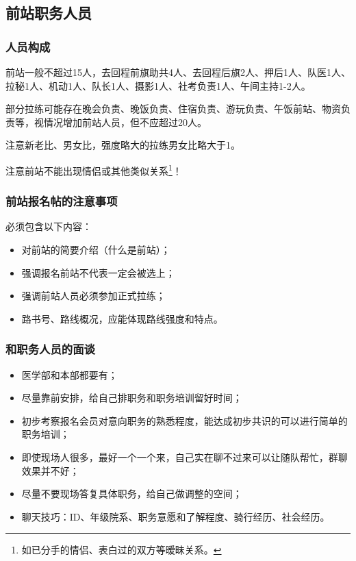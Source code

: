 \documentclass[UTF8]{ctexart}
\begin{document}
\subsection{前站职务人员}

\subsubsection{人员构成}

前站一般不超过15人，去回程前旗助共4人、去回程后旗2人、押后1人、队医1人、拉秘1人、机动1人、队长1人、摄影1人、社考负责1人、午间主持1-2人。

部分拉练可能存在晚会负责、晚饭负责、住宿负责、游玩负责、午饭前站、物资负责等，视情况增加前站人员，但不应超过20人。

注意新老比、男女比，强度略大的拉练男女比略大于1。

注意前站{\color{red}不能出现情侣或其他类似关系}\footnote{如已分手的情侣、表白过的双方等暧昧关系。}！

\subsubsection{前站报名帖的注意事项}

必须包含以下内容：
\begin{itemize}[nosep,left=4em]
    \item 对前站的简要介绍（什么是前站）；
    \item 强调报名前站不代表一定会被选上；
    \item 强调前站人员必须参加正式拉练；
    \item 路书号、路线概况，应能体现路线强度和特点。
\end{itemize}

\subsubsection{和职务人员的面谈}

\begin{itemize}[nosep,left=2em]
    \item 医学部和本部都要有；
    \item 尽量靠前安排，给自己排职务和职务培训留好时间；
    \item 初步考察报名会员对意向职务的熟悉程度，能达成初步共识的可以进行简单的职务培训；
    \item 即使现场人很多，最好一个一个来，自己实在聊不过来可以让随队帮忙，群聊效果并不好；
    \item 尽量不要现场答复具体职务，给自己做调整的空间；
    \item 聊天技巧：ID、年级院系、职务意愿和了解程度、骑行经历、社会经历。
\end{itemize}
\end{document}
